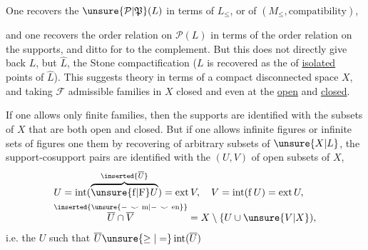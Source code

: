One recovers the  $\unsure{\mathcal P|\mathfrak P}(L)$ in terms of $L_{\leq}$, or of $(M_{\leq},\text{compatibility})$,


and one recovers the order relation on $\mathcal P(L)$ in terms of the order relation on the supports, and ditto for  to the complement. But this does not directly give back $L$, but $\widehat L$, the Stone compactification ($L$ is recovered  as the  of \uline{isolated} points of $\widehat L$). This suggests  theory in terms of a compact  disconnected space $X$, and  taking $\mathcal F$ admissible families in $X$ closed and even at the  \uline{open} and \uline{closed}.

If one allows only finite families, then the supports   are identified with the subsets of $X$ that are both open and closed. But
if one allows infinite figures or infinite sets of figures one  them by recovering   of arbitrary  subsets of $\unsure{X|L}$,  the  support-cosupport pairs are identified with the   $(U,V)$ of open subsets of $X$,
\[
\begin{aligned}
& U=\operatorname{int}(\overbrace{\unsure{\mathrm f|\mathrm F}U}^{\inserted{\overline U}})=\operatorname{ext}V,\quad
 V=\operatorname{int}(\mathrm f\,U)=\operatorname{ext}U,\\
& \overset{\inserted{\unsure{-\ \smile\ \mathrm m|-\ \smile\ \mathrm{en}}}}{\overline U\cap\overline V} = X\setminus\{U\cup\unsure{V|X}),
\end{aligned}
\]
i.e. the  $U$ such that $\overline U\unsure{\geq|= }\operatorname{int}(\overline U)$
